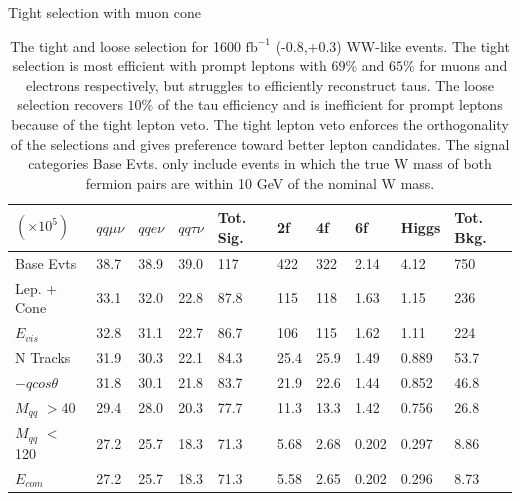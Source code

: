\begin{table}

\caption{The tight and loose selection for 1600 $\text{fb}^{-1}$ (-0.8,+0.3) WW-like events. The tight selection is most efficient with prompt leptons with $69\%$ and $65\%$  for muons and electrons respectively, but struggles to efficiently reconstruct taus. The loose selection recovers $10\%$ of the tau efficiency and is inefficient for prompt leptons because of the tight lepton veto. The tight lepton veto enforces the orthogonality of the selections and gives preference toward better lepton candidates. The signal categories Base Evts. only include events in which the true W mass of both fermion pairs are within 10 GeV of the nominal W mass.}
\label{tab:selection}
 \scriptsize
 Tight selection with muon cone \\
   \begin{tabular}{|p{}|p{}p{}p{}|p{}|p{}p{}p{}p{}|p{}|}
\hline 
 $(\times 10^5)$  & $qq\mu\nu$ & $qqe\nu$ & $qq\tau\nu$ & Tot. Sig. & 2f & 4f & 6f & Higgs & Tot. Bkg. \\ \hline 
Base Evts & {38.7 } &  {38.9 } &  {39.0} & {117} &  {422} &  {322} &  {2.14} &  {4.12} & 750 \\ 

Lep. + Cone & {33.1 } &  {32.0 } &  {22.8} & {87.8} &  {115} &  {118} &  {1.63} &  {1.15} & 236 \\ 
 
$E_{vis}$ & {32.8 } &  {31.1 } &  {22.7} & {86.7} &  {106} &  {115} &  {1.62} &  {1.11} & 224\\ 
 
N Tracks & {31.9 } &  {30.3 } &  {22.1} & {84.3} &  {25.4} &  {25.9} &  {1.49} &  {0.889} & 53.7\\ 
 
$-qcos\theta$ & {31.8 } &  {30.1 } &  {21.8} & {83.7} &  {21.9} &  {22.6} &  {1.44} &  {0.852} & 46.8\\ 
 
$M_{qq}$ $>$40 & {29.4 } &  {28.0 } &  {20.3} & {77.7} &  {11.3} &  {13.3} &  {1.42} &  {0.756} & 26.8\\ 
 
$M_{qq}$ $<$120 & {27.2 } &  {25.7 } &  {18.3} & {71.3} &  {5.68} &  {2.68} &  {0.202} &  {0.297} & 8.86\\ 
 
$E_{com}$ & {27.2 } &  {25.7} &  {18.3} & {71.3} &  {5.58} &  {2.65} &  {0.202} &  {0.296} & 8.73\\ 


\end{tabular}
\end{table}
